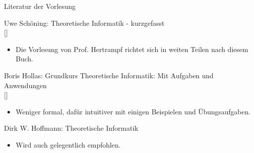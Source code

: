 \begin{frame}{Literatur der Vorlesung}
    \small{Uwe Schöning: Theoretische Informatik - kurzgefasst\\
    \phantom{}[]
    \begin{itemize}
        \item Die Vorlesung von Prof. Hertrampf richtet sich in weiten Teilen nach diesem Buch.
    \end{itemize}
    Boris Hollas: Grundkurs Theoretische Informatik: Mit Aufgaben und Anwendungen \\
    \phantom{}[]\\
    \begin{itemize}
        \item Weniger formal, dafür intuitiver mit einigen Beispielen und Übungsaufgaben.
    \end{itemize}
    Dirk W. Hoffmann: Theoretische Informatik
    \begin{itemize}
        \item Wird auch gelegentlich empfohlen.
    \end{itemize}}
    
\end{frame}

